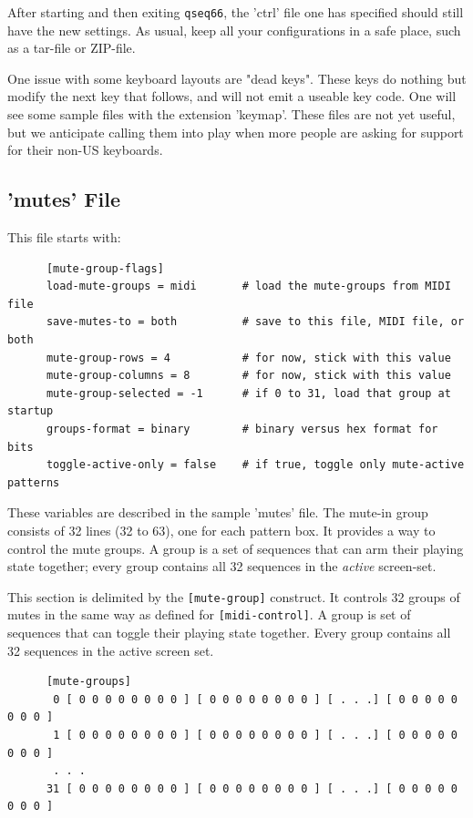    After starting and then exiting \texttt{qseq66},
   the 'ctrl' file one has specified
   should still have the new settings.
   As usual, keep all your configurations in a safe place, such as a tar-file or
   ZIP-file.

   One issue with some keyboard layouts are "dead keys".  These keys do
   nothing but modify the next key that follows, and will not emit
   a useable key code.
   One will see some sample files with the extension 'keymap'.
   These files are not yet useful, but we anticipate calling them into play
   when more people are asking for support for their non-US keyboards.

\subsection{'mutes' File}
\label{subsubsec:configuration_mute_group_control}

   This file starts with:

   \begin{verbatim}
      [mute-group-flags]
      load-mute-groups = midi       # load the mute-groups from MIDI file
      save-mutes-to = both          # save to this file, MIDI file, or both
      mute-group-rows = 4           # for now, stick with this value
      mute-group-columns = 8        # for now, stick with this value
      mute-group-selected = -1      # if 0 to 31, load that group at startup
      groups-format = binary        # binary versus hex format for bits
      toggle-active-only = false    # if true, toggle only mute-active patterns
   \end{verbatim}

   These variables are described in the sample 'mutes' file.
   The mute-in group consists of 32 lines (32 to 63), one for each
   pattern box.
   It provides a way to control the mute groups.
   A group is a set of sequences that can arm their playing state
   together; every group contains all 32 sequences in the
   \textsl{active} screen-set.

   This section is delimited by the \texttt{[mute-group]} construct.
   It controls 32 groups of mutes in the same way as defined for
   \texttt{[midi-control]}. A group is set of sequences that can toggle their
   playing state together.  Every group contains all 32 sequences in the
   active screen set.

   \begin{verbatim}
      [mute-groups]
       0 [ 0 0 0 0 0 0 0 0 ] [ 0 0 0 0 0 0 0 0 ] [ . . .] [ 0 0 0 0 0 0 0 0 ]
       1 [ 0 0 0 0 0 0 0 0 ] [ 0 0 0 0 0 0 0 0 ] [ . . .] [ 0 0 0 0 0 0 0 0 ]
       . . .
      31 [ 0 0 0 0 0 0 0 0 ] [ 0 0 0 0 0 0 0 0 ] [ . . .] [ 0 0 0 0 0 0 0 0 ]
   \end{verbatim}

